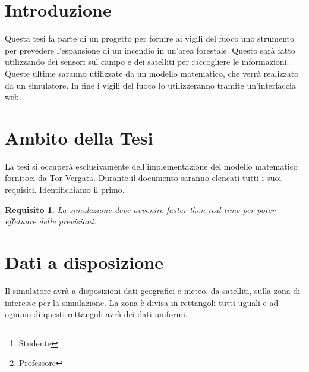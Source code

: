 \documentclass[draft]{article}
\title{\mytitle}
\date{2021}
\author{Diego Bellani\thanks{Studente}\and Enrico Tronci\thanks{Professore}}
\newcommand{\eng}[1]{\foreignlanguage{english}{#1}} %
\let\oldmarginpar\marginpar
\renewcommand{\marginpar}[1]{\oldmarginpar{\raggedright #1}}
\newtheorem{requirement}{Requisito}
\begin{document}
\begin{titlepage}
	\maketitle

	\begin{abstract}
	Questo documento \marginpar{Da espandere.} contiene le specifiche dei
	requisiti per la tesi sulla simulazione \eng{multi-core} di incendi.
	\end{abstract}

	\tableofcontents
	\listoffigures
	\listoftables
\end{titlepage}


\section{Introduzione}

Questa tesi fa parte di un progetto per fornire ai vigili del fuoco uno
strumento per prevedere l'espansione di un incendio in un'area forestale. Questo
sarà fatto utilizzando dei sensori sul campo e dei satelliti per raccogliere le
informazioni. Queste ultime saranno utilizzate da un modello matematico, che
verrà realizzato da un simulatore. In fine i vigili del fuoco lo utilizzeranno
tramite un'interfaccia web.

\section{Ambito della Tesi}

La tesi si occuperà esclusivamente dell'implementazione del modello matematico
fornitoci da Tor Vergata. Durante il documento saranno elencati tutti i suoi
requisiti. Identifichiamo il primo.

\begin{requirement}
La simulazione deve avvenire \eng{faster-then-real-time} per poter effetuare
delle previsioni.
\end{requirement}

\section{Dati a disposizione}

Il simulatore avrà a disposizioni dati geografici e meteo, da satelliti, sulla
zona di interesse per la simulazione. La zona è divisa in rettangoli tutti
uguali e ad ognuno di questi rettangoli avrà dei dati uniformi.
\end{document}
